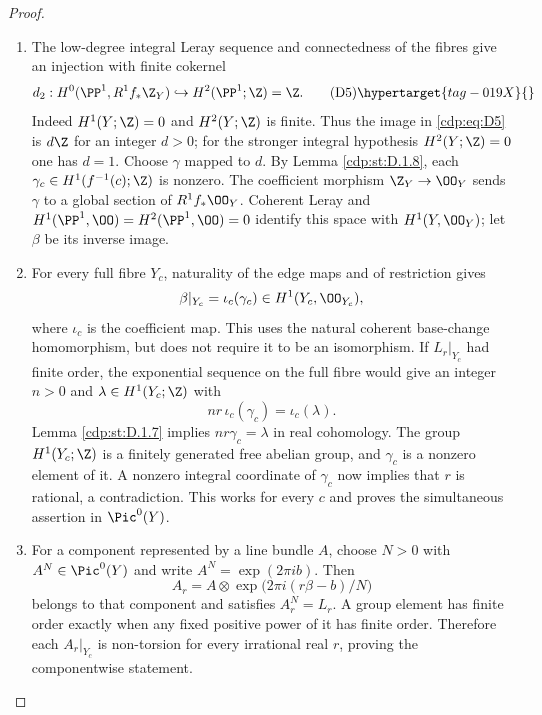 \begin{proof}

\begin{enumerate}[label={$\langle1\rangle$\arabic*.},leftmargin=*]
\item The low-degree integral Leray sequence and connectedness of the
fibres give an injection with finite cokernel
\[
d_2:H^0(\PP^1,R^1f_*\Z_Y)
 \hookrightarrow H^2(\PP^1;\Z)=\Z.                   \tag{D5}\hypertarget{tag-019X}{}\label{cdp:eq:D5}
\]
Indeed $H^1(Y;\Z)=0$ and $H^2(Y;\Z)$ is finite.
Thus the image in \eqref{cdp:eq:D5} is $d\Z$ for an integer $d>0$; for the
stronger integral hypothesis $H^2(Y;\Z)=0$ one has $d=1$.
Choose $\gamma$ mapped to $d$. By Lemma \ref{cdp:st:D.1.8},
each $\gamma_c\in H^1(f^{-1}(c);\Z)$ is nonzero.
The coefficient morphism $\Z_Y\to\OO_Y$ sends $\gamma$ to a
global section of $R^1f_*\OO_Y$. Coherent Leray and
$H^1(\PP^1,\OO)=H^2(\PP^1,\OO)=0$ identify this space with
$H^1(Y,\OO_Y)$; let $\beta$ be its inverse image.

\item For every full fibre $Y_c$, naturality of the edge maps and of
restriction gives
\[
\beta|_{Y_c}=\iota_c(\gamma_c)\in H^1(Y_c,\OO_{Y_c}), 
\]
where $\iota_c$ is the coefficient map. This uses the natural
coherent base-change homomorphism, but does not require it to be
an isomorphism. If $L_r|_{Y_c}$ had finite order, the exponential
sequence on the full fibre would give an integer $n>0$ and
$\lambda\in H^1(Y_c;\Z)$ with
\[
nr\,\iota_c(\gamma_c)=\iota_c(\lambda).
\]
Lemma \ref{cdp:st:D.1.7} implies $nr\gamma_c=\lambda$ in real cohomology.
The group $H^1(Y_c;\Z)$ is a finitely generated free abelian group,
and $\gamma_c$ is a nonzero element of it. A nonzero integral
coordinate of $\gamma_c$ now implies that $r$ is rational, a
contradiction. This works for every $c$ and proves the simultaneous
assertion in $\Pic^0(Y)$.

\item For a component represented by a line bundle $A$, choose $N>0$
with $A^N\in\Pic^0(Y)$ and write $A^N=\exp(2\pi i b)$.
Then
\[
A_r=A\otimes\exp\bigl(2\pi i(r\beta-b)/N\bigr)
\]
belongs to that component and satisfies $A_r^N=L_r$. A group
element has finite order exactly when any fixed positive power of
it has finite order. Therefore each $A_r|_{Y_c}$ is non-torsion
for every irrational real $r$, proving the componentwise statement.

\end{enumerate}
\end{proof}
